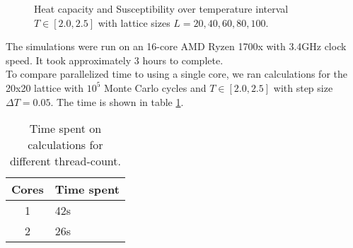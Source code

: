 \documentclass[../main.tex]{subfiles}
\begin{document}
\begin{figure}[!h]
  \caption{Heat capacity and Susceptibility over temperature interval $T \in [2.0, 2.5]$ with lattice sizes $L = {20, 40, 60, 80, 100}$.}
  \label{fig:results-heatcap-suscep}
\end{figure}
\FloatBarrier
The simulations were run on an 16-core AMD Ryzen 1700x with 3.4GHz clock speed. It took approximately 3 hours to complete.\\
To compare parallelized time to using a single core, we ran calculations for the 20x20 lattice with $10^5$ Monte Carlo cycles and $T \in [2.0, 2.5]$ with step size $\Delta T = 0.05$. The time is shown in table \ref{tab:results-MPI}.

\begin{table}[!h]
  \begin{center}
    \begin{tabular}{|c| l|}
      \hline
      Cores & Time spent\\
      \hline
      1 & 42s\\
      2 & 26s\\
      \hline
    \end{tabular}
    \caption{Time spent on calculations for different thread-count.}
    \label{tab:results-MPI}
  \end{center}
\end{table}
\FloatBarrier

\end{document}
